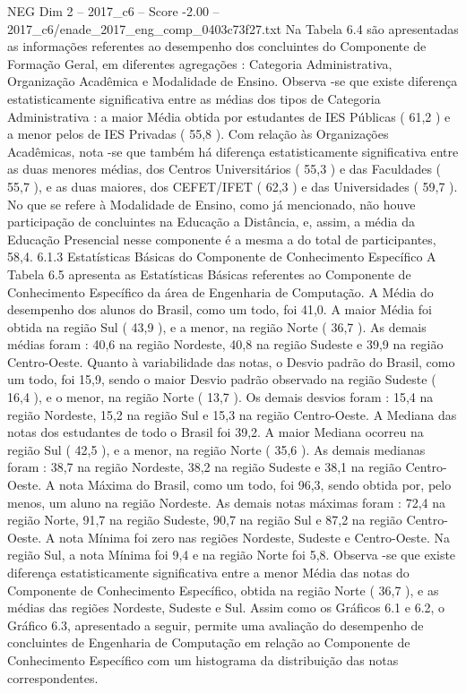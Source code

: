 \begin{textsample}{NEG Dim 2 – 2017\_c6 – Score -2.00 – 2017\_c6/enade\_2017\_eng\_comp\_0403c73f27.txt}
Na Tabela 6.4 são apresentadas as informações referentes ao desempenho dos concluintes do Componente de Formação Geral, em diferentes agregações : Categoria Administrativa, Organização Acadêmica e Modalidade de Ensino.
Observa -se que existe diferença estatisticamente significativa entre as médias dos tipos de Categoria Administrativa : a maior Média obtida por estudantes de IES Públicas ( 61,2 ) e a menor pelos de IES Privadas ( 55,8 ).
Com relação às Organizações Acadêmicas, nota -se que também há diferença estatisticamente significativa entre as duas menores médias, dos Centros Universitários ( 55,3 ) e das Faculdades ( 55,7 ), e as duas maiores, dos CEFET/IFET ( 62,3 ) e das Universidades ( 59,7 ).
No que se refere à Modalidade de Ensino, como já mencionado, não houve participação de concluintes na Educação a Distância, e, assim, a média da Educação Presencial nesse componente é a mesma a do total de participantes, 58,4. 6.1.3 Estatísticas Básicas do Componente de Conhecimento Específico A Tabela 6.5 apresenta as Estatísticas Básicas referentes ao Componente de Conhecimento Específico da área de Engenharia de Computação.
A Média do desempenho dos alunos do Brasil, como um todo, foi 41,0.
A maior Média foi obtida na região Sul ( 43,9 ), e a menor, na região Norte ( 36,7 ).
As demais médias foram : 40,6 na região Nordeste, 40,8 na região Sudeste e 39,9 na região Centro-Oeste.
Quanto à variabilidade das notas, o Desvio padrão do Brasil, como um todo, foi 15,9, sendo o maior Desvio padrão observado na região Sudeste ( 16,4 ), e o menor, na região Norte ( 13,7 ).
Os demais desvios foram : 15,4 na região Nordeste, 15,2 na região Sul e 15,3 na região Centro-Oeste.
A Mediana das notas dos estudantes de todo o Brasil foi 39,2.
A maior Mediana ocorreu na região Sul ( 42,5 ), e a menor, na região Norte ( 35,6 ).
As demais medianas foram : 38,7 na região Nordeste, 38,2 na região Sudeste e 38,1 na região Centro-Oeste.
A nota Máxima do Brasil, como um todo, foi 96,3, sendo obtida por, pelo menos, um aluno na região Nordeste.
As demais notas máximas foram : 72,4 na região Norte, 91,7 na região Sudeste, 90,7 na região Sul e 87,2 na região Centro-Oeste.
A nota Mínima foi zero nas regiões Nordeste, Sudeste e Centro-Oeste.
Na região Sul, a nota Mínima foi 9,4 e na região Norte foi 5,8.
Observa -se que existe diferença estatisticamente significativa entre a menor Média das notas do Componente de Conhecimento Específico, obtida na região Norte ( 36,7 ), e as médias das regiões Nordeste, Sudeste e Sul.
Assim como os Gráficos 6.1 e 6.2, o Gráfico 6.3, apresentado a seguir, permite uma avaliação do desempenho de concluintes de Engenharia de Computação em relação ao Componente de Conhecimento Específico com um histograma da distribuição das notas correspondentes.

\end{textsample}
